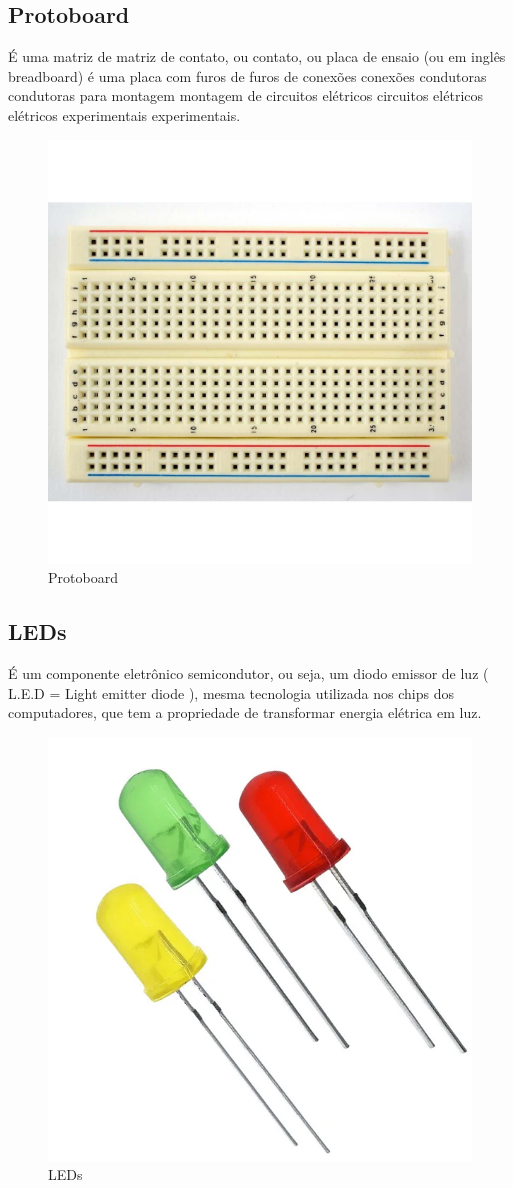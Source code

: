 \documentclass[12pt]{article}
\begin{document}
\subsection{Protoboard}
É uma matriz de matriz de contato, ou contato, ou placa de ensaio (ou em inglês breadboard)
é uma placa com furos de furos de conexões conexões condutoras condutoras para montagem montagem de
circuitos elétricos circuitos elétricos elétricos experimentais experimentais.

\begin{figure}[ht]
  \centering
  \includegraphics[width=.5\textwidth]{Images/protoboard.jpg}
  \caption{Protoboard}
  \label{fig:exampleProtoboard}
\end{figure}

\subsection{LEDs}
É  um componente eletrônico semicondutor, ou seja, um diodo emissor de luz ( L.E.D = Light emitter diode ),
mesma tecnologia utilizada nos chips dos computadores, que tem a propriedade de transformar energia elétrica em luz.

\begin{figure}[ht]
  \centering
  \includegraphics[width=.45\textwidth]{Images/LEDs.jpg}
  \caption{LEDs}
  \label{fig:exampleLEDs}
\end{figure}
\end{document}
